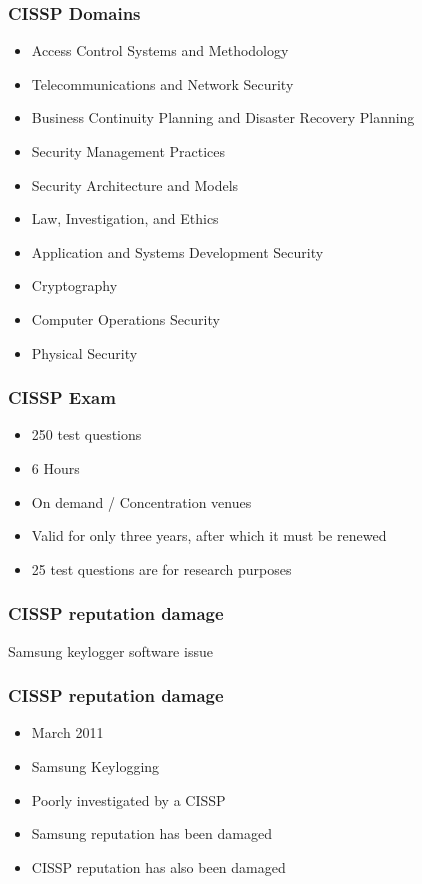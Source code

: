 \documentclass{beamer}
\begin{document}
\begin{frame}
\frametitle{CISSP Domains}
\begin{itemize}
    \item Access Control Systems and Methodology
    \item Telecommunications and Network Security
    \item Business Continuity Planning and Disaster Recovery Planning
    \item Security Management Practices
    \item Security Architecture and Models
    \item Law, Investigation, and Ethics
    \item Application and Systems Development Security
    \item Cryptography
    \item Computer Operations Security
    \item Physical Security
\end{itemize}
\end{frame}


\begin{frame}
\frametitle{CISSP Exam}
\begin{itemize}
    \item 250 test questions
    \item 6 Hours
    \item On demand / Concentration venues
    \item Valid for only three years, after which it must be renewed
    \item 25 test questions are for research purposes
\end{itemize}
\end{frame}


\begin{frame}
\frametitle{CISSP reputation damage}
\begin{center}
   \huge {Samsung keylogger software issue}
\end{center}
\end{frame}


\begin{frame}
\frametitle{CISSP reputation damage}
\begin{itemize}
    \item March 2011
    \item Samsung Keylogging
    \item Poorly investigated by a CISSP
    \item Samsung reputation has been damaged
    \item CISSP reputation has also been damaged
\end{itemize}
\end{frame}
\end{document}
